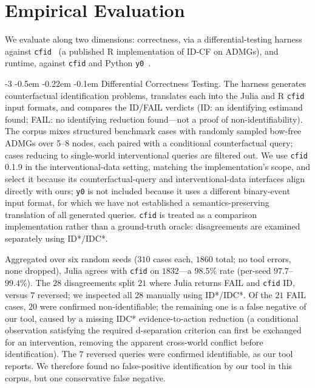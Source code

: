 \documentclass[runningheads]{llncs}
\makeatletter
\renewcommand\paragraph{\@startsection{paragraph}{4}{\z@}%
                       {-3\p@ \@plus -2\p@ \@minus -2\p@}%
                       {-0.5em \@plus -0.22em \@minus -0.1em}%
                       {\normalfont\normalsize\bfseries}}
\makeatother
\begin{document}
\section{Empirical Evaluation}\label{sec:evaluation}
We evaluate along two dimensions: correctness, via a differential-testing harness against \texttt{cfid}~\cite{RJ-2023-053} (a published R implementation of ID-CF on ADMGs), and runtime, against \texttt{cfid} and Python \texttt{y0}~\cite{hoyt2025y0}.

\paragraph{Differential Correctness Testing.}
The harness generates counterfactual identification problems, translates each into the Julia and R \texttt{cfid} input formats, and compares the ID/FAIL verdicts (ID: an identifying estimand found; FAIL: no identifying reduction found---not a proof of non-identifiability). The corpus mixes structured benchmark cases with randomly sampled bow-free ADMGs over 5--8 nodes, each paired with a conditional counterfactual query; cases reducing to single-world interventional queries are filtered out. We use \texttt{cfid} 0.1.9 in the interventional-data setting, matching the implementation's scope, and select it because its counterfactual-query and interventional-data interfaces align directly with ours; \texttt{y0} is not included because it uses a different binary-event input format, for which we have not established a semantics-preserving translation of all generated queries. \texttt{cfid} is treated as a comparison implementation rather than a ground-truth oracle: disagreements are examined separately using ID*/IDC*.

Aggregated over six random seeds ($310$ cases each, $1860$ total; no tool errors, none dropped), Julia agrees with \texttt{cfid} on $1832$---a $98.5\%$ rate (per-seed $97.7$--$99.4\%$). The $28$ disagreements split $21$ where Julia returns FAIL and \texttt{cfid} ID, versus $7$ reversed; we inspected all $28$ manually using ID*/IDC*. Of the $21$ FAIL cases, $20$ were confirmed non-identifiable; the remaining one is a false negative of our tool, caused by a missing IDC* evidence-to-action reduction (a conditional observation satisfying the required d-separation criterion can first be exchanged for an intervention, removing the apparent cross-world conflict before identification). The $7$ reversed queries were confirmed identifiable, as our tool reports. We therefore found no false-positive identification by our tool in this corpus, but one conservative false negative.
\end{document}
